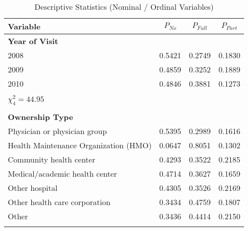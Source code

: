 \documentclass[11pt, oneside]{article}        %
\begin{document}

{\footnotesize 
\begin{center}

\label{tab:desc1}

\begin{longtable}{lccc}
\caption{Descriptive Statistics (Nominal / Ordinal Variables)}\\


\hline \hline Variable & $P_{No}$ & $P_{Full}$ & $P_{Part}$ \\ \hline \endhead

\hline \endfoot
\hline \hline \endlastfoot
\textbf{Year of Visit}                 &          &            &            \\
2008                                   & 0.5421   & 0.2749     & 0.1830     \\
2009                                   & 0.4859   & 0.3252     & 0.1889     \\
2010                                   & 0.4846   & 0.3881     & 0.1273     \\
                                       &          &            &            \\
$\chi^2_4 = 44.95$                     &          &            &            \\
                                       &          &            &            \\
\textbf{Ownership Type}                &          &            &            \\
Physician or physician group           & 0.5395   & 0.2989     & 0.1616     \\
Health Maintenance Organization (HMO)  & 0.0647   & 0.8051     & 0.1302     \\
Community health center                & 0.4293   & 0.3522     & 0.2185     \\
Medical/academic health center         & 0.4714   & 0.3627     & 0.1659     \\
Other hospital                         & 0.4305   & 0.3526     & 0.2169     \\
Other health care corporation          & 0.3434   & 0.4759     & 0.1807     \\
Other                                  & 0.3436   & 0.4414     & 0.2150     \\
                                       &          &            &            \\

\end{longtable}
\end{center}}
\end{document}
